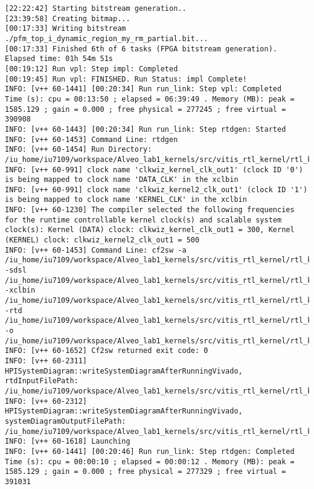 \begin{center}
\begin{lstlisting}[label=lst:vlog,caption=Файл v++\_vinc.log]
[22:22:42] Starting bitstream generation..
[23:39:58] Creating bitmap...
[00:17:33] Writing bitstream ./pfm_top_i_dynamic_region_my_rm_partial.bit...
[00:17:33] Finished 6th of 6 tasks (FPGA bitstream generation). Elapsed time: 01h 54m 51s 
[00:19:12] Run vpl: Step impl: Completed
[00:19:45] Run vpl: FINISHED. Run Status: impl Complete!
INFO: [v++ 60-1441] [00:20:34] Run run_link: Step vpl: Completed
Time (s): cpu = 00:13:50 ; elapsed = 06:39:49 . Memory (MB): peak = 1585.129 ; gain = 0.000 ; free physical = 277245 ; free virtual = 390908
INFO: [v++ 60-1443] [00:20:34] Run run_link: Step rtdgen: Started
INFO: [v++ 60-1453] Command Line: rtdgen
INFO: [v++ 60-1454] Run Directory: /iu_home/iu7109/workspace/Alveo_lab1_kernels/src/vitis_rtl_kernel/rtl_kernel_wizard_2/_x/link/run_link
INFO: [v++ 60-991] clock name 'clkwiz_kernel_clk_out1' (clock ID '0') is being mapped to clock name 'DATA_CLK' in the xclbin
INFO: [v++ 60-991] clock name 'clkwiz_kernel2_clk_out1' (clock ID '1') is being mapped to clock name 'KERNEL_CLK' in the xclbin
INFO: [v++ 60-1230] The compiler selected the following frequencies for the runtime controllable kernel clock(s) and scalable system clock(s): Kernel (DATA) clock: clkwiz_kernel_clk_out1 = 300, Kernel (KERNEL) clock: clkwiz_kernel2_clk_out1 = 500
INFO: [v++ 60-1453] Command Line: cf2sw -a /iu_home/iu7109/workspace/Alveo_lab1_kernels/src/vitis_rtl_kernel/rtl_kernel_wizard_2/_x/link/int/address_map.xml -sdsl /iu_home/iu7109/workspace/Alveo_lab1_kernels/src/vitis_rtl_kernel/rtl_kernel_wizard_2/_x/link/int/sdsl.dat -xclbin /iu_home/iu7109/workspace/Alveo_lab1_kernels/src/vitis_rtl_kernel/rtl_kernel_wizard_2/_x/link/int/xclbin_orig.xml -rtd /iu_home/iu7109/workspace/Alveo_lab1_kernels/src/vitis_rtl_kernel/rtl_kernel_wizard_2/_x/link/int/vinc.rtd -o /iu_home/iu7109/workspace/Alveo_lab1_kernels/src/vitis_rtl_kernel/rtl_kernel_wizard_2/_x/link/int/vinc.xml
INFO: [v++ 60-1652] Cf2sw returned exit code: 0
INFO: [v++ 60-2311] HPISystemDiagram::writeSystemDiagramAfterRunningVivado, rtdInputFilePath: /iu_home/iu7109/workspace/Alveo_lab1_kernels/src/vitis_rtl_kernel/rtl_kernel_wizard_2/_x/link/int/vinc.rtd
INFO: [v++ 60-2312] HPISystemDiagram::writeSystemDiagramAfterRunningVivado, systemDiagramOutputFilePath: /iu_home/iu7109/workspace/Alveo_lab1_kernels/src/vitis_rtl_kernel/rtl_kernel_wizard_2/_x/link/int/systemDiagramModelSlrBaseAddress.json
INFO: [v++ 60-1618] Launching 
INFO: [v++ 60-1441] [00:20:46] Run run_link: Step rtdgen: Completed
Time (s): cpu = 00:00:10 ; elapsed = 00:00:12 . Memory (MB): peak = 1585.129 ; gain = 0.000 ; free physical = 277329 ; free virtual = 391031

\end{lstlisting}
\end{center}
